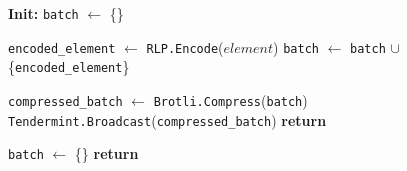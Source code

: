 \begin{figure}[t!]
  \begin{adjustbox}{minipage=[t]{\columnwidth}}
    \begin{algorithm}[H]
      \renewcommand{\thealgorithm}{Compress Collector}         
      \caption{}%
      \label{alg:collector-brotli}%
      \small
      \begin{algorithmic}[1]
            \State \textbf{Init:} \texttt{batch} $\leftarrow$ \{\}
      
            \label{alg:brotli_add_tx}
            			\State \texttt{encoded\_element} $\leftarrow$ \texttt{RLP.Encode}($element$)
					        \State \texttt{batch} $\leftarrow$ \texttt{batch} $\cup$ \{\texttt{encoded\_element}\}
                \EndIf

             			\State \texttt{compressed\_batch} $\leftarrow$  \texttt{Brotli.Compress}(\texttt{batch})
                	\State \texttt{Tendermint.Broadcast}(\texttt{compressed\_batch})
              		\State {}
             	  \EndIf	
                \State \textbf{return}
            \EndFunction
            
            \label{alg:brotli_reset}
            		\State \texttt{batch} $\leftarrow$ \{\}
                \State \textbf{return}
            \EndFunction
        \end{algorithmic}
      \end{algorithm}
	\end{adjustbox}
  \end{figure}

